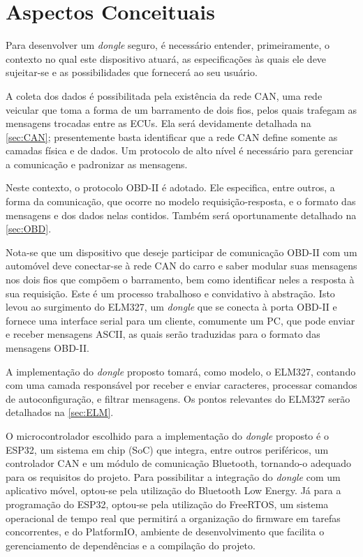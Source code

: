 \chapter{Aspectos Conceituais} \label{cap:conceitos}

Para desenvolver um \textit{dongle} seguro, é necessário entender, primeiramente, o contexto no qual este dispositivo atuará, as especificações às quais ele deve sujeitar-se e as possibilidades que fornecerá ao seu usuário.

A coleta dos dados é possibilitada pela existência da rede CAN, uma rede veicular que toma a forma de um barramento de dois fios, pelos quais trafegam as mensagens trocadas entre as ECUs. Ela será devidamente detalhada na \autoref{sec:CAN}; presentemente basta identificar que a rede CAN define somente as camadas física e de dados. Um protocolo de alto nível é necessário para gerenciar a comunicação e padronizar as mensagens.

Neste contexto, o protocolo OBD-II é adotado. Ele especifica, entre outros, a forma da comunicação, que ocorre no modelo requisição-resposta, e o formato das mensagens e dos dados nelas contidos. Também será oportunamente detalhado na \autoref{sec:OBD}. 

Nota-se que um dispositivo que deseje participar de comunicação OBD-II com um automóvel deve conectar-se à rede CAN do carro e saber modular suas mensagens nos dois fios que compõem o barramento, bem como identificar neles a resposta à sua requisição. Este é um processo trabalhoso e convidativo à abstração. Isto levou ao surgimento do ELM327, um \textit{dongle} que se conecta à porta OBD-II e fornece uma interface serial para um cliente, comumente um PC, que pode enviar e receber mensagens ASCII, as quais serão traduzidas para o formato das mensagens OBD-II. 

A implementação do \textit{dongle} proposto tomará, como modelo, o ELM327, contando com uma camada responsável por receber e enviar caracteres, processar comandos de autoconfiguração, e filtrar mensagens. Os pontos relevantes do ELM327 serão detalhados na \autoref{sec:ELM}.

O microcontrolador escolhido para a implementação do \textit{dongle} proposto 
é o ESP32, um sistema em chip (SoC) que integra, entre outros periféricos, 
um controlador CAN e um módulo de comunicação Bluetooth, tornando-o adequado 
para os requisitos do projeto. Para possibilitar a integração do 
\textit{dongle} com um aplicativo móvel, optou-se pela utilização do 
Bluetooth Low Energy. Já para a programação do ESP32, optou-se pela 
utilização do FreeRTOS, um sistema operacional de tempo real que permitirá 
a organização do firmware em tarefas concorrentes, e do PlatformIO, ambiente 
de desenvolvimento que facilita o gerenciamento de dependências e a 
compilação do projeto.

